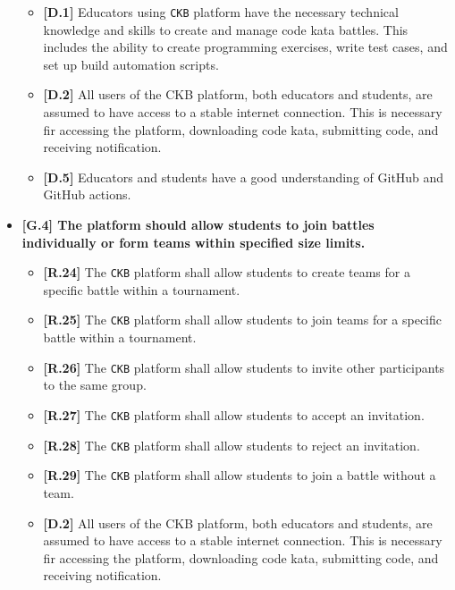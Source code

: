 \begin{itemize}
\begin{itemize}
            \item \textbf{[D.1]} Educators using \verb|CKB| platform have the necessary technical knowledge and skills to create and manage code kata battles. 
            This includes the ability to create programming exercises, write test cases, and set up build automation scripts.
            \item \textbf{[D.2]} All users of the CKB platform, both educators and students, are assumed to have access to a stable internet connection. This is
            necessary fir accessing the platform, downloading code kata, submitting code, and receiving notification.  
            \item \textbf{[D.5]} Educators and students have a good understanding of GitHub and GitHub actions.

        \end{itemize}

        \item \textbf{{[G.4]} The platform should allow students to join battles individually or form teams within specified size limits. }
        \begin{itemize}
            \item \textbf{[R.24]} The \verb|CKB| platform shall allow students to create teams for a specific battle within a tournament. 
            \item \textbf{[R.25]} The \verb|CKB| platform shall allow students to join teams for a specific battle within a tournament.
            \item \textbf{[R.26]} The \verb|CKB| platform shall allow students to invite other participants to the same group.
            \item \textbf{[R.27]} The \verb|CKB| platform shall allow students to accept an invitation.
            \item \textbf{[R.28]} The \verb|CKB| platform shall allow students to reject an invitation. 
            \item \textbf{[R.29]} The \verb|CKB| platform shall allow students to join a battle without a team.
            \item \textbf{[D.2]} All users of the CKB platform, both educators and students, are assumed to have access to a stable internet connection. This is
            necessary fir accessing the platform, downloading code kata, submitting code, and receiving notification.
        \end{itemize}


\end{itemize}
